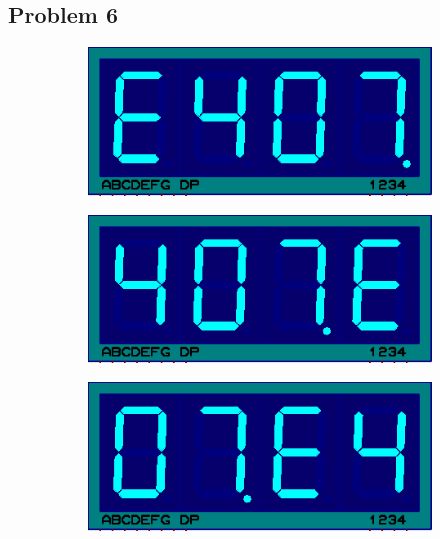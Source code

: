 \documentclass{lab_sheet}
\begin{document}
            \subsection*{Problem 6}
        \begin{figure}[H]
            \begin{subfigure}{.33\textwidth}
              \centering
              \includegraphics[frame,width=.9\linewidth]{../Figures/scr1}  
              \label{fig:prob6-a}
              \caption{}
            \end{subfigure}
            \begin{subfigure}{.33\textwidth}
              \centering
              \includegraphics[frame,width=.9\linewidth]{../Figures/scr2}  
              \label{fig:prob6-b}
              \caption{}
            \end{subfigure}
            \begin{subfigure}{.33\textwidth}
              \centering
                \includegraphics[frame,width=.9\linewidth]{../Figures/scr3}  

\end{subfigure}
\end{figure}
\end{document}
